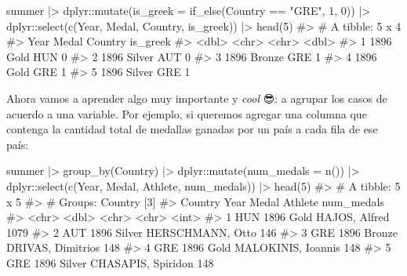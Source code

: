 \documentclass[
  letterpaper,
  DIV=11,
  numbers=noendperiod,
  oneside]{scrreprt}
\newenvironment{Shaded}{\begin{snugshade}}{\end{snugshade}}
\newcommand{\AttributeTok}[1]{\textcolor[rgb]{0.40,0.45,0.13}{#1}}
\newcommand{\CommentTok}[1]{\textcolor[rgb]{0.37,0.37,0.37}{#1}}
\newcommand{\DecValTok}[1]{\textcolor[rgb]{0.68,0.00,0.00}{#1}}
\newcommand{\FunctionTok}[1]{\textcolor[rgb]{0.28,0.35,0.67}{#1}}
\newcommand{\NormalTok}[1]{\textcolor[rgb]{0.00,0.23,0.31}{#1}}
\newcommand{\SpecialCharTok}[1]{\textcolor[rgb]{0.37,0.37,0.37}{#1}}
\newcommand{\StringTok}[1]{\textcolor[rgb]{0.13,0.47,0.30}{#1}}
\begin{document}
\begin{Shaded}
\begin{Highlighting}[]
\NormalTok{summer }\SpecialCharTok{|\textgreater{}} 
\NormalTok{  dplyr}\SpecialCharTok{::}\FunctionTok{mutate}\NormalTok{(}\AttributeTok{is\_greek =} \FunctionTok{if\_else}\NormalTok{(Country }\SpecialCharTok{==} \StringTok{"GRE"}\NormalTok{, }\DecValTok{1}\NormalTok{, }\DecValTok{0}\NormalTok{)) }\SpecialCharTok{|\textgreater{}} 
\NormalTok{  dplyr}\SpecialCharTok{::}\FunctionTok{select}\NormalTok{(}\FunctionTok{c}\NormalTok{(Year, Medal, Country, is\_greek)) }\SpecialCharTok{|\textgreater{}}
  \FunctionTok{head}\NormalTok{(}\DecValTok{5}\NormalTok{)}
\CommentTok{\#\textgreater{} \# A tibble: 5 x 4}
\CommentTok{\#\textgreater{}    Year Medal  Country is\_greek}
\CommentTok{\#\textgreater{}   \textless{}dbl\textgreater{} \textless{}chr\textgreater{}  \textless{}chr\textgreater{}      \textless{}dbl\textgreater{}}
\CommentTok{\#\textgreater{} 1  1896 Gold   HUN            0}
\CommentTok{\#\textgreater{} 2  1896 Silver AUT            0}
\CommentTok{\#\textgreater{} 3  1896 Bronze GRE            1}
\CommentTok{\#\textgreater{} 4  1896 Gold   GRE            1}
\CommentTok{\#\textgreater{} 5  1896 Silver GRE            1}
\end{Highlighting}
\end{Shaded}

Ahora vamos a aprender algo muy importante y \emph{cool} 😎: a agrupar
los casos de acuerdo a una variable. Por ejemplo, si queremos agregar
una columna que contenga la cantidad total de medallas ganadas por un
país a cada fila de ese país:

\begin{Shaded}
\begin{Highlighting}[]
\NormalTok{summer }\SpecialCharTok{|\textgreater{}} 
  \FunctionTok{group\_by}\NormalTok{(Country) }\SpecialCharTok{|\textgreater{}}
\NormalTok{  dplyr}\SpecialCharTok{::}\FunctionTok{mutate}\NormalTok{(}\AttributeTok{num\_medals =} \FunctionTok{n}\NormalTok{()) }\SpecialCharTok{|\textgreater{}} 
\NormalTok{  dplyr}\SpecialCharTok{::}\FunctionTok{select}\NormalTok{(}\FunctionTok{c}\NormalTok{(Year, Medal, Athlete, num\_medals)) }\SpecialCharTok{|\textgreater{}}
  \FunctionTok{head}\NormalTok{(}\DecValTok{5}\NormalTok{)}
\CommentTok{\#\textgreater{} \# A tibble: 5 x 5}
\CommentTok{\#\textgreater{} \# Groups:   Country [3]}
\CommentTok{\#\textgreater{}   Country  Year Medal  Athlete            num\_medals}
\CommentTok{\#\textgreater{}   \textless{}chr\textgreater{}   \textless{}dbl\textgreater{} \textless{}chr\textgreater{}  \textless{}chr\textgreater{}                   \textless{}int\textgreater{}}
\CommentTok{\#\textgreater{} 1 HUN      1896 Gold   HAJOS, Alfred            1079}
\CommentTok{\#\textgreater{} 2 AUT      1896 Silver HERSCHMANN, Otto          146}
\CommentTok{\#\textgreater{} 3 GRE      1896 Bronze DRIVAS, Dimitrios         148}
\CommentTok{\#\textgreater{} 4 GRE      1896 Gold   MALOKINIS, Ioannis        148}
\CommentTok{\#\textgreater{} 5 GRE      1896 Silver CHASAPIS, Spiridon        148}
\end{Highlighting}
\end{Shaded}
\end{document}
